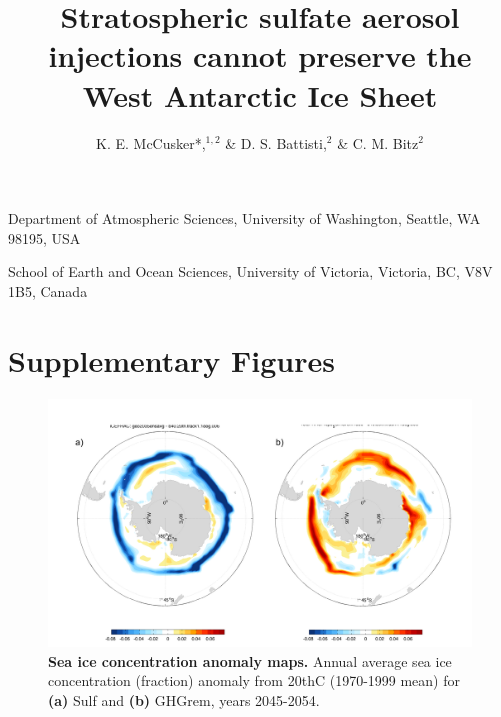 \documentclass{nature}
\title{Stratospheric sulfate aerosol injections cannot preserve the West Antarctic Ice Sheet} %
\author{K. E. McCusker*,$^{1,2}$ \& D. S. Battisti,$^{2}$ \& C. M. Bitz$^2$}
\begin{document}
\maketitle

\begin{affiliations}
 \item Department of Atmospheric Sciences, University of Washington, Seattle, WA 98195, USA
 \item School of Earth and Ocean Sciences, University of Victoria, Victoria, BC, V8V 1B5, Canada
\end{affiliations}

\section*{Supplementary Figures}


\begin{figure}[Supplementary Figure]%
\noindent\includegraphics[width=39pc]{figures/SuppFig1.pdf}  %
\caption{\textbf{Sea ice concentration anomaly maps.} Annual average sea ice concentration (fraction) anomaly from 20thC (1970-1999 mean) for \textbf{(a)} Sulf and \textbf{(b)} GHGrem, years 2045-2054.}
\label{fig:supp1}
\end{figure}
\end{document}
